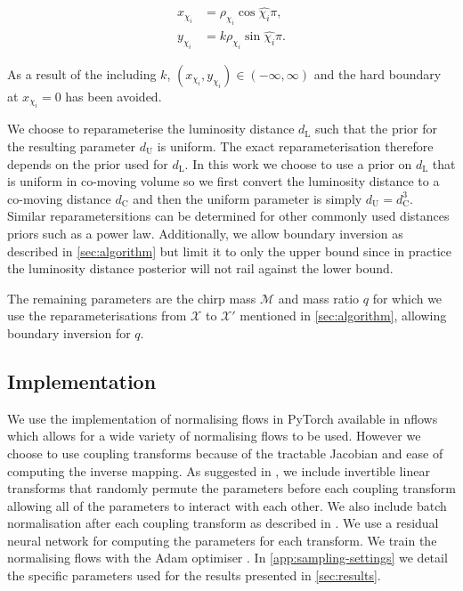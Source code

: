 \documentclass[%
 reprint,
nofootinbib,
 amsmath,amssymb,
 aps,
 prd,
]{revtex4-2}
\newcommand{\physical}{\mathcal{X}}
\newcommand{\nflows}{{\sc nflows}\xspace}
\newcommand{\pytorch}{{\sc PyTorch}\xspace}
\begin{document}
\begin{equation}\label{eq:spin_reparam}
    \begin{split}
        x_{\chi_{i}} & = \rho_{\chi_{i}} \cos{\hat{\chi_{i}}\pi}, \\
        y_{\chi_{i}} & = k\rho_{\chi_{i}} \sin{\hat{\chi_{i}}\pi}.
    \end{split}
\end{equation}

As a result of the including $k$, $(x_{\chi_i}, y_{\chi_i}) \in (-\infty, \infty)$ and the hard boundary at $x_{\chi_{i}}=0$ has been avoided.

We choose to reparameterise the luminosity distance $d_{\text{L}}$ such that the prior for the resulting parameter $d_{\text{U}}$ is uniform. The exact reparameterisation therefore depends on the prior used for $d_{\text{L}}$. In this work we choose to use a prior on $d_{\text{L}}$ that is uniform in co-moving volume so we first convert the luminosity distance to a co-moving distance $d_{\text{C}}$ and then the uniform parameter is simply $d_{\text{U}} = d_{\text{C}}^{3}$. Similar reparametersitions can be determined for other commonly used distances priors such as a power law. Additionally, we allow boundary inversion as described in \cref{sec:algorithm} but limit it to only the upper bound since in practice the luminosity distance posterior will not rail against the lower bound.

The remaining parameters are the chirp mass $\mathcal{M}$ and mass ratio $q$ for which we use the reparameterisations from $\physical$ to $\physical'$ mentioned in \cref{sec:algorithm}, allowing boundary inversion for $q$.


\subsection{Implementation}

We use the implementation of normalising flows in \pytorch \cite{Paszke:2019:pt} available in \nflows \cite{nflows} which allows for a wide variety of normalising flows to be used. However we choose to use coupling transforms \cite{Dinh:2016:rnvp} because of the tractable Jacobian and ease of computing the inverse mapping.  As suggested in \cite{Dinh:2014nice,Kingma:2018glow}, we include invertible linear transforms that randomly permute the parameters before each coupling transform allowing all of the parameters to interact with each other. We also include batch normalisation \cite{Ioffe:2015:bn} after each coupling transform as described in \cite{Dinh:2016:rnvp}. We use a residual neural network \cite{He:2015:drl, He:2016:imdrn} for computing the parameters for each transform. We train the normalising flows with the Adam optimiser \cite{Kingma:2014}. In \cref{app:sampling-settings} we detail the specific parameters used for the results presented in \cref{sec:results}.
\end{document}
